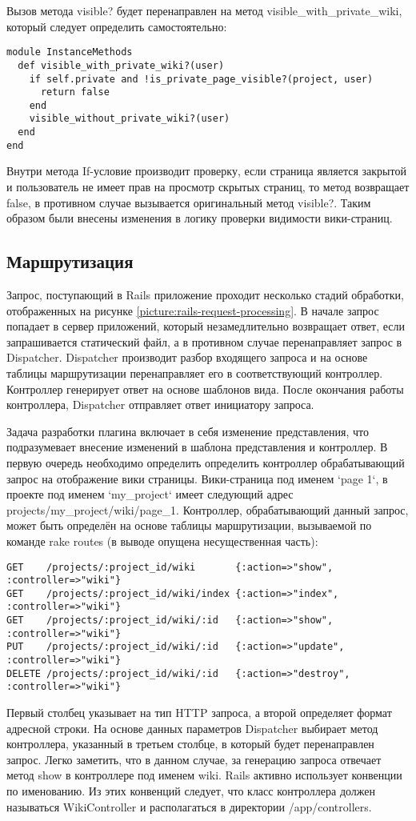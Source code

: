 Вызов метода visible? будет перенаправлен на метод
visible\_with\_private\_wiki, который следует определить
самостоятельно:
\small{\begin{lstlisting}
module InstanceMethods
  def visible_with_private_wiki?(user)  
    if self.private and !is_private_page_visible?(project, user)
      return false
    end
    visible_without_private_wiki?(user)
  end
end
\end{lstlisting}}
Внутри метода If-условие производит проверку, если страница является закрытой и
пользователь не имеет прав на просмотр скрытых страниц, то метод возвращает
false, в противном случае вызывается оригинальный метод visible?. Таким образом
были внесены изменения в логику проверки видимости вики-страниц.

\subsection{Маршрутизация}
Запрос, поступающий в Rails приложение проходит несколько стадий обработки,
отображенных на рисунке \ref{picture:rails-request-processing}.
В начале запрос попадает в сервер приложений, который незамедлительно возвращает
ответ, если запрашивается статический файл, а в противном случае перенаправляет
запрос в Dispatcher. Dispatcher производит разбор входящего запроса и на основе
таблицы маршрутизации перенаправляет его в соответствующий контроллер.
Контроллер генерирует ответ на основе шаблонов вида. После окончания работы
контроллера, Dispatcher отправляет ответ инициатору запроса. 


Задача разработки плагина включает в себя изменение представления, что
подразумевает внесение изменений в шаблона представления и контроллер. В первую
очередь необходимо определить определить контроллер обрабатывающий запрос на
отображение вики страницы. Вики-страница под именем `page 1`, в проекте под
именем `my\_project` имеет следующий адрес projects/my\_project/wiki/page\_1.
Контроллер, обрабатывающий данный запрос, может быть определён на основе
таблицы маршрутизации, вызываемой по команде rake routes (в выводе опущена
несущественная часть):
\small{\begin{lstlisting}
GET    /projects/:project_id/wiki       {:action=>"show", :controller=>"wiki"}
GET    /projects/:project_id/wiki/index {:action=>"index", :controller=>"wiki"}
GET    /projects/:project_id/wiki/:id   {:action=>"show", :controller=>"wiki"}
PUT    /projects/:project_id/wiki/:id   {:action=>"update", :controller=>"wiki"}
DELETE /projects/:project_id/wiki/:id   {:action=>"destroy", :controller=>"wiki"}
\end{lstlisting}}
Первый столбец указывает на тип HTTP запроса, а второй определяет формат
адресной строки. На основе данных параметров Dispatcher выбирает метод
контроллера, указанный в третьем столбце, в который будет перенаправлен запрос.
Легко заметить, что в данном случае, за генерацию запроса отвечает метод show в
контроллере под именем wiki. Rails активно использует конвенции по именованию.
Из этих конвенций следует, что класс контроллера должен называться
WikiController и располагаться в директории /app/controllers.

